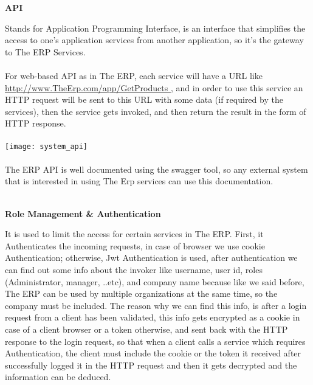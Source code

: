 \begin{adjustwidth}{2cm}{}
    \textbf{API}
    \begin{adjustwidth}{1cm}{}
        Stands for Application Programming Interface, is an interface that simplifies the access to
one’s application services from another application, so it’s the gateway to The ERP
Services.\\\\
For web-based API as in The ERP, each service will have a URL like \url{http://www.TheErp.com/app/GetProducts }, and in order to use this service an HTTP request will
be sent to this URL with some data (if required by the services), then the service gets invoked,
and then return the result in the form of HTTP response.\\\\
\texttt{[image: system\_api]}\\\\
The ERP API is well documented using the swagger tool, so any external system that is
interested in using The Erp services can use this documentation.\\\\
    \end{adjustwidth}

    \textbf{Role Management \& Authentication}\\
    
    \begin{adjustwidth}{1cm}{}
        It is used to limit the access for certain services in The ERP.
        First, it Authenticates the incoming requests, in case of browser we use cookie
        Authentication; otherwise, Jwt Authentication is used, after authentication we can find out
        some info about the invoker like username, user id, roles (Administrator, manager, ..etc), and
        company name because like we said before, The ERP can be used by multiple organizations
        at the same time, so the company must be included. The reason why we can find this info, is
        after a login request from a client has been validated, this info gets encrypted as a cookie in
        case of a client browser or a token otherwise, and sent back with the HTTP response to the
        login request, so that when a client calls a service which requires Authentication, the client
        must include the cookie or the token it received after successfully logged it in the HTTP
        request and then it gets decrypted and the information can be deduced.\\\\
    \end{adjustwidth}


\end{adjustwidth}
